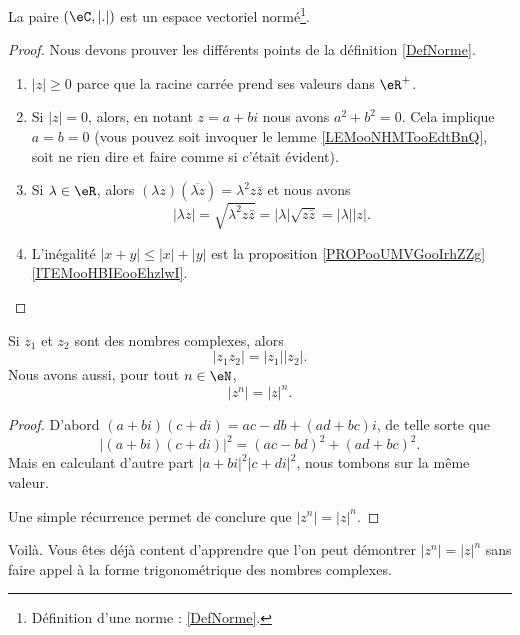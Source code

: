 \begin{proposition}     \label{PROPooZJAXooYwSSvo}
	La paire \( (\eC, | . |)\) est un espace vectoriel normé\footnote{Définition d'une norme : \ref{DefNorme}.}.
\end{proposition}

\begin{proof}
	Nous devons prouver les différents points de la définition \ref{DefNorme}.
	\begin{enumerate}
		\item
		      \( | z |\geq 0\) parce que la racine carrée prend ses valeurs dans \( \eR^+\).
		\item
		      Si \( | z |=0\), alors, en notant \( z=a+bi\) nous avons \( a^2+b^2=0\). Cela implique \( a=b=0\) (vous pouvez soit invoquer le lemme \ref{LEMooNHMTooEdtBnQ}, soit ne rien dire et faire comme si c'était évident).
		\item
		      Si \( \lambda\in \eR\), alors \( (\lambda z)(\overline{ \lambda z })=\lambda^2z\bar z\) et nous avons
		      \begin{equation}
			      | \lambda z |=\sqrt{ \lambda^2z\bar z }=| \lambda |\sqrt{ z\bar z }=| \lambda | |z |.
		      \end{equation}
		\item
		      L'inégalité \( | x+y |\leq | x |+| y |\) est la proposition \ref{PROPooUMVGooIrhZZg}\ref{ITEMooHBIEooEhzlwI}.
	\end{enumerate}
\end{proof}


\begin{proposition} \label{PROPooXLARooYSDCsF}
	Si \( z_1\) et \( z_2\) sont des nombres complexes, alors
	\begin{equation}
		| z_1z_2 |=| z_1 | |z_2 |.
	\end{equation}
	Nous avons aussi, pour tout \( n\in \eN\),
	\begin{equation}       \label{EQooATTQooRpJeCo}
		| z^n |=| z |^n.
	\end{equation}
\end{proposition}

\begin{proof}
	D'abord \( (a+bi)(c+di)=ac-db+(ad+bc)i\), de telle sorte que
	\begin{equation}
		| (a+bi)(c+di) |^2=(ac-bd)^2+(ad+bc)^2.
	\end{equation}
	Mais en calculant d'autre part \( | a+bi |^2| c+di |^2\), nous tombons sur la même valeur.

	Une simple récurrence permet de conclure que \( | z^n |=| z |^n\).
\end{proof}
Voilà. Vous êtes déjà content d'apprendre que l'on peut démontrer \( | z^n |=| z |^n\) sans faire appel à la forme trigonométrique des nombres complexes.

